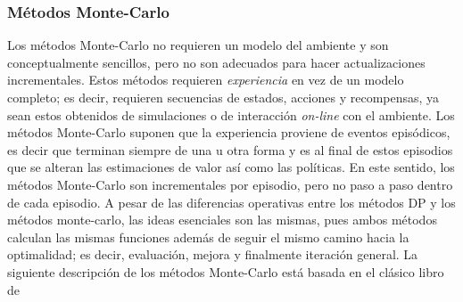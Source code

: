 \documentclass[11pt]{article}
\theoremstyle{plain}
\begin{document}
\subsubsection{Métodos Monte-Carlo} 
Los métodos Monte-Carlo no requieren un modelo del ambiente y son conceptualmente sencillos, pero no son adecuados para hacer actualizaciones incrementales. Estos métodos requieren \textit{experiencia} en vez de un modelo completo; es decir, requieren secuencias de estados, acciones y recompensas, ya sean estos obtenidos de simulaciones o de interacción \textit{on-line} con el ambiente. Los métodos Monte-Carlo suponen que la experiencia proviene de eventos episódicos, es decir que terminan siempre de una u otra forma y es al final de estos episodios que se alteran las estimaciones de valor así como las políticas. En este sentido, los métodos Monte-Carlo son incrementales por episodio, pero no paso a paso dentro de cada episodio. A pesar de las diferencias operativas entre los métodos DP y los métodos monte-carlo, las ideas esenciales son las mismas, pues ambos métodos calculan las mismas funciones además de seguir el mismo camino hacia la optimalidad; es decir, evaluación, mejora y finalmente iteración general. La siguiente descripción de los métodos Monte-Carlo está basada en el clásico libro de \cite{sutton1998reinforcement}
\end{document}
